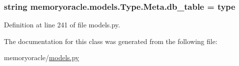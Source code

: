 \subsubsection[{db\+\_\+table}]{\setlength{\rightskip}{0pt plus 5cm}string memoryoracle.\+models.\+Type.\+Meta.\+db\+\_\+table = \textquotesingle{}type\textquotesingle{}\hspace{0.3cm}{\ttfamily [static]}}\label{classmemoryoracle_1_1models_1_1Type_1_1Meta_acd32ff6b85b29241422025e87d2b2f0a}


Definition at line 241 of file models.\+py.



The documentation for this class was generated from the following file\+:\begin{DoxyCompactItemize}
\item 
memoryoracle/\hyperlink{models_8py}{models.\+py}\end{DoxyCompactItemize}
